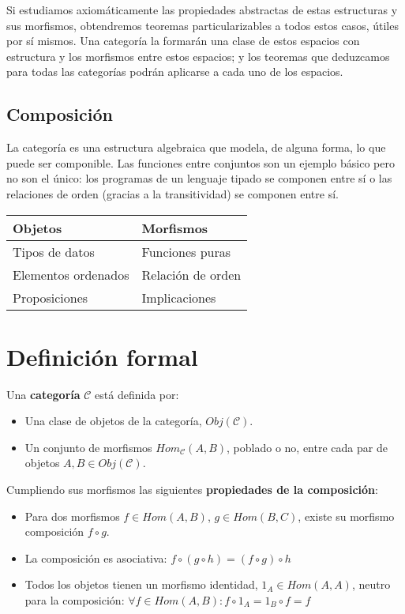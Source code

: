 \documentclass[11pt, fleqn, spanish]{book}
\newcommand{\C}{\mathcal{C}}
\begin{document}
Si estudiamos axiomáticamente las propiedades abstractas de estas estructuras y sus morfismos,
obtendremos teoremas particularizables a todos estos casos, útiles por sí mismos.
Una categoría la formarán una clase de estos espacios con estructura y los morfismos entre estos
espacios; y los teoremas que deduzcamos para todas las categorías podrán aplicarse a cada uno de
los espacios.

\subsection{Composición}
La categoría es una estructura algebraica que modela, de alguna forma,
lo que puede ser componible. Las funciones entre conjuntos son un ejemplo
básico pero no son el único: los programas de un lenguaje tipado se componen
entre sí o las relaciones de orden (gracias a la transitividad) se componen
entre sí.

\begin{center}
  \begin{tabular}{l|l}
    Objetos & Morfismos \\
    \hline
    Tipos de datos & Funciones puras \\
    Elementos ordenados & Relación de orden \\
    Proposiciones & Implicaciones
  \end{tabular}
\end{center}


\section {Definición formal}
\begin{definition}
  Una \textbf{categoría} $\C$ está definida por:
  
  \begin{itemize}
  \item Una clase de objetos de la categoría, $Obj(\mathcal{C})$.
  \item Un conjunto de morfismos $Hom_{\C}(A,B)$, poblado o no, entre
    cada par de objetos $A,B \in Obj(\C)$.
  \end{itemize}
  
  Cumpliendo sus morfismos las siguientes \textbf{propiedades de la composición}:

  \begin{itemize}
  \item Para dos morfismos $f \in Hom(A,B)$, $g \in Hom(B,C)$, existe su
    morfismo composición $f \circ g$.
  \item La composición es asociativa: $f \circ (g \circ h) = (f \circ g) \circ h$
  \item Todos los objetos tienen un morfismo identidad,
    $1_{A} \in Hom(A,A)$, neutro para la composición:
    $\forall f \in Hom(A,B): f \circ 1_{A} = 1_{B} \circ f = f$
  \end{itemize}
\end{definition}
\end{document}
